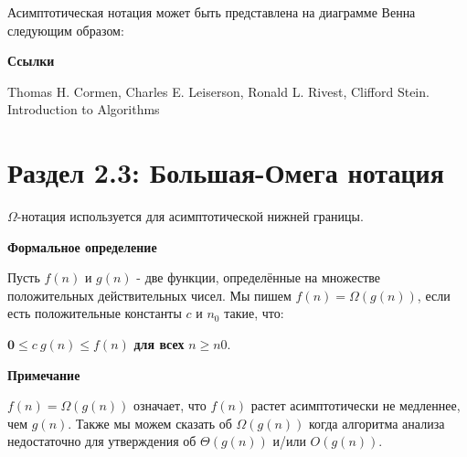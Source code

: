 \vspace{\baselineskip}

Асимптотическая нотация может быть представлена на диаграмме Венна следующим образом:


\vspace{\baselineskip}

\textbf{Ссылки}

\vspace{\baselineskip}

Thomas H. Cormen, Charles E. Leiserson, Ronald L. Rivest, Clifford Stein. Introduction to Algorithms

\vspace{\baselineskip}

\section*{Раздел 2.3: Большая-Омега нотация}

\vspace{\baselineskip}

$\Omega$-нотация используется для асимптотической нижней границы.

\vspace{\baselineskip}

\textbf{Формальное определение}

\vspace{\baselineskip}

Пусть $f(n)$ и $g(n)$ - две функции, определённые на множестве положительных действительных чисел. Мы пишем $f(n) = \Omega(g(n))$, если есть положительные константы $c$ и $n_0$ такие, что:

\vspace{\baselineskip}

$\textbf{0} \leqslant c \ g(n) \leqslant f(n)$ \textbf{для всех} $n \geqslant n0$.

\vspace{\baselineskip}

\textbf{Примечание}

\vspace{\baselineskip}

$f(n) = \Omega(g(n))$ означает, что $f(n)$ растет асимптотически не медленнее, чем $g(n)$. Также мы можем сказать об $\Omega(g(n))$ когда алгоритма анализа недостаточно для утверждения об $\Theta(g(n))$ и/или $O(g(n))$.

